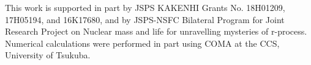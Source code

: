 \documentclass[%
superscriptaddress,
showpacs,
nofootinbib,
amsmath,amssymb,
aps,
prc,
twocolumn,
floatfix ]%
{revtex4-1}
\begin{document}



\begin{acknowledgments}
This work is supported in part by JSPS KAKENHI Grants No. 18H01209, 17H05194, and 16K17680,
and
by JSPS-NSFC Bilateral Program for Joint Research Project
on Nuclear mass and life for unravelling mysteries of r-process.
Numerical calculations were performed in part using COMA at the CCS,
University of Tsukuba.
\end{acknowledgments}



\end{document}
